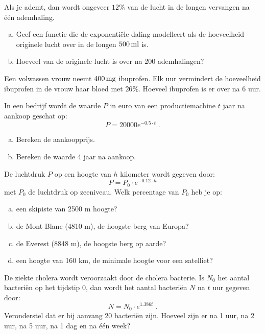 \documentclass[12pt,twoside]{article}
\begin{document}
\begin{oefening}
  Als je ademt, dan wordt ongeveer $12\%$ van de lucht in de longen vervangen na één ademhaling.
  \begin{enumerate}[(a)]
  \item Geef een functie die de exponentiële daling modelleert als de hoeveelheid originele lucht over in de longen $500 \ml$ is.
  \item Hoeveel van de originele lucht is over na 200 ademhalingen?
  \end{enumerate}
\end{oefening}

\begin{oefening}
  Een volwassen vrouw neemt $400 \mg$ ibuprofen. Elk uur vermindert de hoeveelheid ibuprofen in de vrouw haar bloed met $26\%$. Hoeveel ibuprofen is er over na 6 uur.
\end{oefening}

\begin{oefening}
In een bedrijf wordt de waarde $P$ in euro van een productiemachine $t$ jaar na aankoop geschat op:
$$P = 20000 e^{-0.5\cdot t}\;.$$
\begin{enumerate}[(a)]
  \item Bereken de aankoopprijs.
  \item Bereken de waarde 4 jaar na aankoop.
\end{enumerate}
\end{oefening}

\begin{oefening}
De luchtdruk $P$ op een hoogte van $h$ kilometer wordt gegeven door:
$$P = P_0\cdot e^{-0.12\cdot h}$$
met $P_0$ de luchtdruk op zeeniveau. Welk percentage van $P_0$ heb je op:
\begin{enumerate}[(a)]
  \item een skipiste van 2500 m hoogte?
  \item de Mont Blanc (4810 m), de hoogste berg van Europa?
  \item de Everest (8848 m), de hoogste berg op aarde?
  \item een hoogte van 160 km, de minimale hoogte voor een satelliet?
\end{enumerate}
\end{oefening}

\begin{oefening}
De ziekte cholera wordt veroorzaakt door de cholera bacterie. Is $N_0$ het aantal bacteriën op het tijdstip 0, dan wordt het aantal bacteriën $N$ na $t$ uur gegeven door:
$$N=N_0\cdot e^{1.386 t}\;.$$
Veronderstel dat er bij aanvang 20 bacteriën zijn. Hoeveel zijn er na 1 uur, na 2 uur, na 5 uur, na 1 dag en na één week?
\end{oefening}
\end{document}
